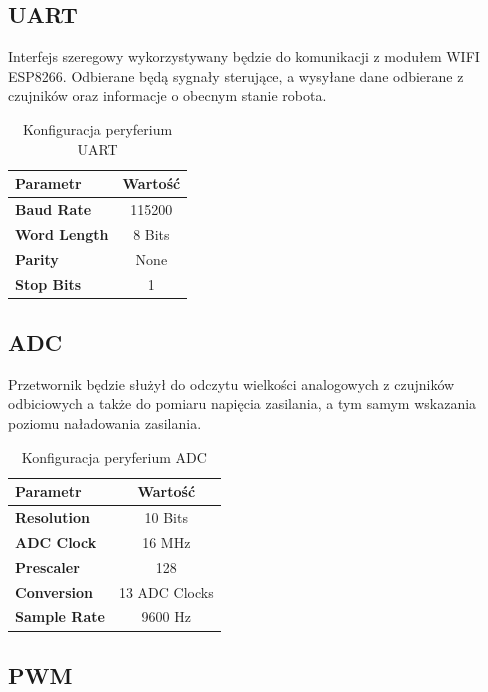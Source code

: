 \documentclass[10pt, a4paper]{article}
\begin{document}
\subsection{UART}

Interfejs szeregowy wykorzystywany będzie do komunikacji z modułem WIFI
ESP8266. Odbierane będą sygnały sterujące, a wysyłane dane odbierane z czujników oraz informacje o obecnym stanie robota.

\begin{table}[H]
	\centering
	\begin{tabular}{|l|c|} \hline
		\textbf{Parametr} & Wartość \\
		\hline
		\hline  \textbf{Baud Rate}&115200  \\\hline
		\textbf{Word Length } & 8 Bits \\\hline
		\textbf{Parity} &  None\\
		\hline
		\textbf{Stop Bits}& 1\\
		\hline
	\end{tabular}
	\caption{Konfiguracja peryferium UART}
	\label{tab:UART}
\end{table}

\subsection{ADC}

Przetwornik będzie służył do odczytu wielkości analogowych z czujników odbiciowych a także do pomiaru napięcia zasilania, a tym samym wskazania poziomu naładowania zasilania.

\begin{table}[H]
	\centering
	\begin{tabular}{|l|c|} \hline
		\textbf{Parametr} & Wartość \\
		\hline
		\hline  \textbf{Resolution}&10 Bits  \\\hline
		\textbf{ADC Clock } & 16 MHz \\\hline
		\textbf{Prescaler} &  128\\
		\hline
		\textbf{Conversion}& 13 ADC Clocks\\
		\hline
		\textbf{Sample Rate}& 9600 Hz\\
		\hline
	\end{tabular}
	\caption{Konfiguracja peryferium ADC}
	\label{tab:USART}
\end{table}

\subsection{PWM}
\end{document}

